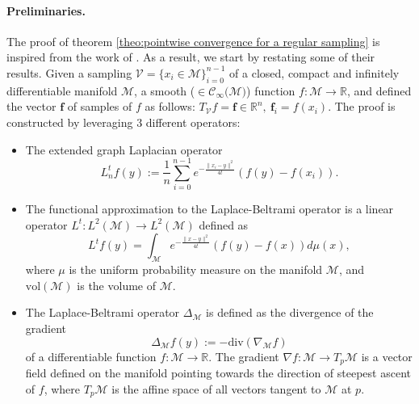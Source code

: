 \documentclass{article} %
\renewcommand{\b}[1]{{\bm{#1}}}  %
\newcommand{\R}{\mathbb{R}}
\newcommand{\V}{\mathcal{V}}  %
\begin{document}
\paragraph{Preliminaries.}
The proof of theorem \ref{theo:pointwise convergence for a regular sampling} is inspired from the work of \cite{belkin2005towards}. As a result, we start by restating some of their results.
Given a sampling $\V = \{x_i\in\mathcal M\}_{i=0}^{n-1}$ of a closed, compact and infinitely differentiable manifold $\mathcal{M}$, a smooth ($\in\mathcal{C}_\infty(\mathcal{M)}$) function  $f:\mathcal{M} \rightarrow \mathbb{R}$, and defined the vector $\b{f}$ of samples of $f$ as follows: $T_\V f = \b{f} \in \mathbb{R}^n,\ \b{f}_i = f(x_i)$.
The proof is constructed by leveraging 3 different operators:
\begin{itemize}
    \item The extended graph Laplacian operator
	\begin{equation}
	\label{eq:Heat Kernel Graph Laplacian operator}
	 L_n^tf(y) := \frac{1}{n}\sum_{i=0}^{n-1} e^{ -\frac{\|x_i-y\|^2}{4t}} \left(f(y)-f(x_i)\right).
	\end{equation}
	\item The functional approximation to the Laplace-Beltrami operator is a linear operator $L^t: L^{2}(\mathcal{M}) \rightarrow L^{2}(\mathcal{M})$ defined  as
	\begin{equation}
    \label{eq:Functional approximation to the Laplace-Beltrami operator}
	L^tf(y) = \int_{\mathcal{M}} e^{-\frac{\|x-y\|^2}{4t}}\left(f(y)-f(x)\right)d\mu(x),
	\end{equation}
	where $\mu$ is the uniform probability measure on the manifold $\mathcal{M}$, and $\text{vol}(\mathcal{M})$ is the volume of $\mathcal{M}$.
	\item
	The Laplace-Beltrami operator $\Delta_{\mathcal{M}}$ is defined as the divergence of the gradient
	\begin{equation}
        \label{eq:laplace-beltrami}
        \Delta_{\mathcal M}f(y):= -\text{div}(\nabla_{\mathcal M}f)
    \end{equation}
    of a differentiable function $f: \mathcal M\rightarrow \R$. The gradient $\nabla f: \mathcal M \rightarrow T_p\mathcal M$ is a vector field defined on the manifold pointing towards the direction of steepest ascent of $f$, where $T_p\mathcal M$ is the affine space of all vectors tangent to $\mathcal M$ at $p$.

\end{itemize}
\end{document}
